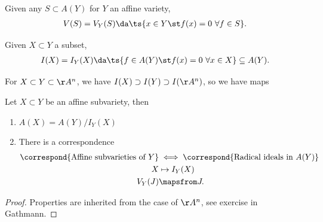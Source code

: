 Given any \(S\subset A(Y)\) for \(Y\) an affine variety,
\begin{align*}  
V(S) = V_Y(S) \da\ts{x\in Y \st f(x) = 0\,\,\forall f\in S}
.\end{align*}

Given \(X\subset Y\) a subset,
\begin{align*}  
I(X) = I_Y(X) \da\ts{f\in A(Y) \st f(x) = 0\,\,\forall x\in X} \subseteq A(Y)
.\end{align*}

\begin{example}

For \(X\subset Y \subset \AA^n\), we have
\(I(X) \supset I(Y) \supset I(\AA^n)\), so we have maps

\begin{center}\end{center}

\end{example}

\begin{theorem}[?]

Let \(X\subset Y\) be an affine subvariety, then

\begin{enumerate}
\def\labelenumi{\alph{enumi}.}
\item
  \(A(X) = A(Y) / I_Y(X)\)
\item
  There is a correspondence
  \begin{align*}  
  \correspond{\text{Affine subvarieties of }Y} 
  &\iff \correspond{\text{Radical ideals in }A(Y)} \\
  X &\mapsto I_Y(X) \\
  V_Y(J) &\mapsfrom J
  .\end{align*}
\end{enumerate}

\end{theorem}

\begin{proof}

Properties are inherited from the case of \(\AA^n\), see exercise in
Gathmann.

\end{proof}


